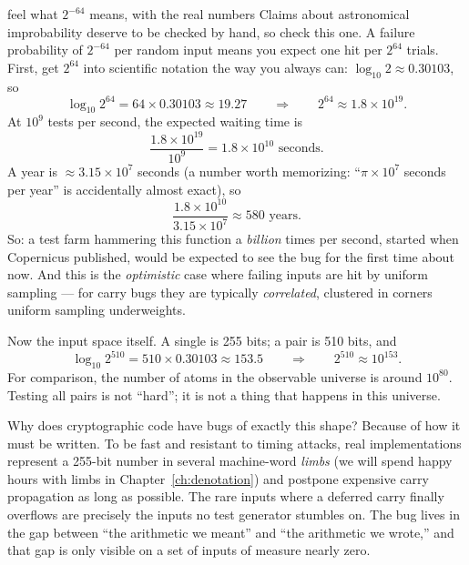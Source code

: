 \begin{worked}{feel what $2^{-64}$ means, with the real numbers}
Claims about astronomical improbability deserve to be checked by hand, so
check this one. A failure probability of $2^{-64}$ per random input means
you expect one hit per $2^{64}$ trials. First, get $2^{64}$ into scientific
notation the way you always can: $\log_{10} 2 \approx 0.30103$, so
\[
\log_{10} 2^{64} = 64 \times 0.30103 \approx 19.27
\qquad\Longrightarrow\qquad
2^{64} \approx 1.8 \times 10^{19}.
\]
At $10^9$ tests per second, the expected waiting time is
\[
\frac{1.8 \times 10^{19}}{10^{9}} = 1.8 \times 10^{10} \text{ seconds}.
\]
A year is $\approx 3.15 \times 10^{7}$ seconds (a number worth memorizing:
``$\pi \times 10^7$ seconds per year'' is accidentally almost exact), so
\[
\frac{1.8 \times 10^{10}}{3.15 \times 10^{7}} \approx 580 \text{ years}.
\]
So: a test farm hammering this function a \emph{billion} times per second,
started when Copernicus published, would be expected to see the bug for the
first time about now. And this is the \emph{optimistic} case where failing
inputs are hit by uniform sampling --- for carry bugs they are typically
\emph{correlated}, clustered in corners uniform sampling underweights.

Now the input space itself. A single  is 255 bits; a
pair is 510 bits, and
\[
\log_{10} 2^{510} = 510 \times 0.30103 \approx 153.5
\qquad\Longrightarrow\qquad
2^{510} \approx 10^{153}.
\]
For comparison, the number of atoms in the observable universe is around
$10^{80}$. Testing all pairs is not ``hard''; it is not a thing that
happens in this universe.
\end{worked}

Why does cryptographic code have bugs of exactly this shape? Because of how it
must be written. To be fast and resistant to timing attacks, real
implementations represent a 255-bit number in several machine-word
\emph{limbs} (we will spend happy hours with limbs in
Chapter~\ref{ch:denotation}) and postpone expensive carry propagation as long
as possible. The rare inputs where a deferred carry finally overflows are
precisely the inputs no test generator stumbles on. The bug lives in the gap
between ``the arithmetic we meant'' and ``the arithmetic we wrote,'' and that
gap is only visible on a set of inputs of measure nearly zero.

